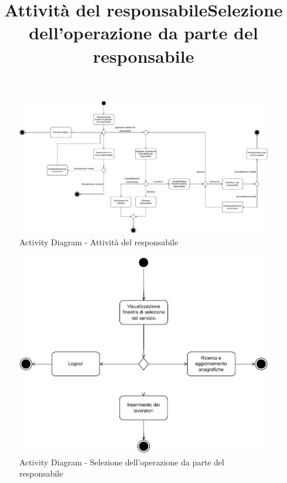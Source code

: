 \documentclass[a4paper,11pt]{article}
\begin{document}
\newpage


\begin{center}
	\title{\textbf{Attività del responsabile}}
	\maketitle
\end{center}
\begin{figure}[htpb]
	\centering
	\includegraphics[width=1.2\textwidth]{diagrams/Activity_Diagram_-_Responsabile.pdf}
	\caption{Activity Diagram - Attività del responsabile}
	\label{fig:act_dia_resp}
\end{figure}


\newpage


\begin{center}
	\title{\textbf{Selezione dell'operazione da parte del responsabile}}
	\maketitle
\end{center}
\begin{figure}[htpb]
	\centering
	\includegraphics[width=1\textwidth]{diagrams/Activity_Diagram_-_Selezione.pdf}
	\caption{Activity Diagram - Selezione dell'operazione da parte del responsabile}
	\label{fig:act_dia_selezione}
\end{figure}
\end{document}
